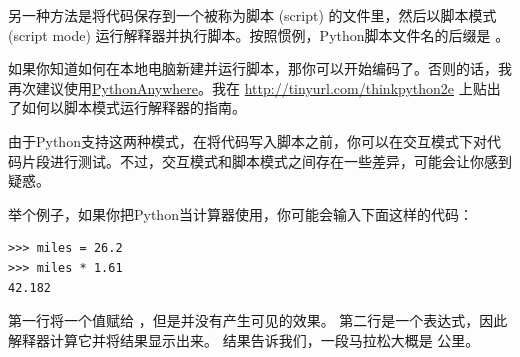 
另一种方法是将代码保存到一个被称为脚本 (script) 的文件里，然后以脚本模式 (script mode) 运行解释器并执行脚本。按照惯例，Python脚本文件名的后缀是 。
  
  


如果你知道如何在本地电脑新建并运行脚本，那你可以开始编码了。否则的话，我再次建议使用\hyperref[python_anywhere]{PythonAnywhere}。我在 \href{http://tinyurl.com/thinkpython2e}{http://tinyurl.com/thinkpython2e} 上贴出了如何以脚本模式运行解释器的指南。


由于Python支持这两种模式，在将代码写入脚本之前，你可以在交互模式下对代码片段进行测试。不过，交互模式和脚本模式之间存在一些差异，可能会让你感到疑惑。
  
  


举个例子，如果你把Python当计算器使用，你可能会输入下面这样的代码：

\begin{lstlisting}
>>> miles = 26.2
>>> miles * 1.61
42.182
\end{lstlisting}


第一行将一个值赋给 ，但是并没有产生可见的效果。 第二行是一个表达式，因此解释器计算它并将结果显示出来。 结果告诉我们，一段马拉松大概是  公里。

